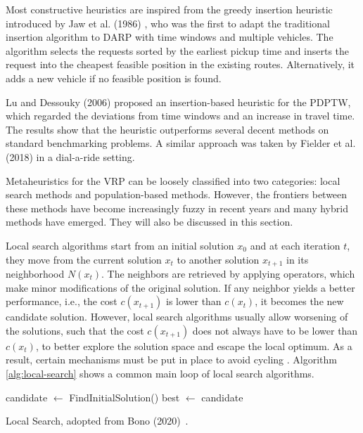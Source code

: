 Most constructive heuristics are inspired from the greedy insertion heuristic introduced by Jaw et al. (1986) \cite{Jaw1986}, who was the first to adapt the traditional insertion algorithm to DARP with time windows and multiple vehicles. The algorithm selects the requests sorted by the earliest pickup time and inserts the request into the cheapest feasible position in the existing routes. Alternatively, it adds a new vehicle if no feasible position is found.

Lu and Dessouky (2006) \cite{insertionHeuristics} proposed an insertion-based heuristic for the PDPTW, which regarded the deviations from time windows and an increase in travel time. The results show that the heuristic outperforms several decent methods on standard benchmarking problems. A similar approach was taken by Fielder et al. (2018) \cite{fiedler} in a dial-a-ride setting.


Metaheuristics for the VRP can be loosely classified into two categories: local search methods and population-based methods. However, the frontiers between these methods have become increasingly fuzzy in recent years and many hybrid methods have emerged. They will also be discussed in this section.

Local search algorithms start from an initial solution $x_0$ and at each iteration $t$, they move from the current solution $x_t$ to another solution $x_{t+1}$ in its neighborhood $N(x_t)$. The neighbors are retrieved by applying operators, which make minor modifications of the original solution. If any neighbor yields a better performance, i.e., the cost $c(x_{t+1})$ is lower than $c(x_t)$, it becomes the new candidate solution. However, local search algorithms usually allow worsening of the solutions, such that the cost $c(x_{t+1})$ does not always have to be lower than $c(x_t)$, to better explore the solution space and escape the local optimum. As a result, certain mechanisms must be put in place to avoid cycling \cite{Bono2020, toth2015vrp}. Algorithm \ref{alg:local-search} shows a common main loop of local search algorithms.

\begin{algorithm}[!ht]
\SetAlgoLined
 candidate $\leftarrow$ FindInitialSolution()\;
 best $\leftarrow$ candidate\;
 \caption{Local Search, adopted from Bono (2020)~\cite[p.~36~(modified)]{Bono2020}.}
 \label{alg:local-search}
\end{algorithm}

